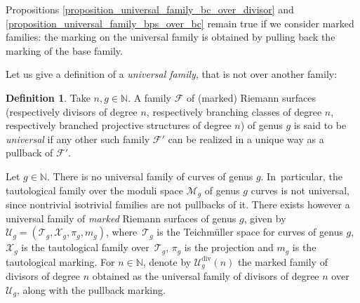 \documentclass[JEP,XML,SOM,Unicode,NoEqCountersInSection,published]{cedram}
\newcommand{\N}{\mathbb N}
\DeclareMathOperator{\Div}{div}
\theoremstyle{definition}
\newtheorem{definition}{Definition}[subsection]
\theoremstyle{plain}
\begin{document}
Propositions \ref{proposition_universal_family_bc_over_divisor} and \ref{proposition_universal_family_bps_over_bc} remain true if we consider marked families: the marking on the universal family is obtained by pulling back the marking of the base family.

Let us give a definition of a \emph{universal family}, that is not over another family:

\begin{definition}\label{definition_universal_family}
Take $n, g \in \N$.
A family $\mathcal F$ of (marked) Riemann surfaces (respectively divisors of degree $n$, respectively branching classes of degree $n$, respectively branched projective structures of degree $n$) of genus $g$ is said to be \emph{universal} if any other such family $\mathcal F'$ can be realized in a unique way as a pullback of $\mathcal F'$.
\end{definition}

Let $g \in \N$. There is no universal family of curves of genus $g$. In~particular, the tautological family over the moduli space $\mathcal M_g$ of genus $g$ curves is not universal, since nontrivial isotrivial families are not pullbacks of it.
There exists however a universal family of \emph{marked} Riemann surfaces of genus $g$, given by $\mathcal U_g = \left(\mathcal T_g, \mathcal X_g, \pi_g, m_g\right)$, where~$\mathcal T_g$ is the Teichmüller space for curves of genus $g$, $\mathcal X_g$ is the tautological family over~$\mathcal T_g$, $\pi_g$ is the projection and $m_g$ is the tautological marking.
For $n \in \N$, denote by $\mathcal U_g^{\Div}(n)$ the marked family of divisors of degree $n$ obtained as the universal family of divisors of degree $n$ over $\mathcal U_g$, along with the pullback marking.
\end{document}
